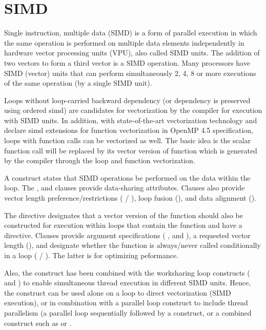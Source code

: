 \pagebreak
\chapter{SIMD}
\label{chap:simd}

Single instruction, multiple data (SIMD) is a form of parallel execution 
in which the same operation is performed on multiple data elements 
independently in hardware vector processing units (VPU), also called SIMD units.
The addition of two vectors to form a third vector is a SIMD operation.
Many processors have SIMD (vector) units that can perform simultaneously 
2, 4, 8 or more executions of the same operation (by a single SIMD unit). 

Loops without loop-carried backward dependency (or dependency is preserved using 
ordered simd) are candidates for vectorization by the compiler for 
execution with SIMD units. In addition, with state-of-the-art vectorization 
technology and declare simd extensions for function vectorization in OpenMP 4.5 
specification, loops with function calls can be vectorized as well. 
The basic idea is the scalar function call will be replaced by its vector version 
of function which is generated by the compiler through the loop and function 
vectorization.

A  construct states that SIMD operations be performed on the
data within the loop.  The ,  and 
 clauses provide data-sharing attributes.  Clauses 
also provide vector length preference/restrictions ( 
/ ), loop fusion (), and data 
alignment ().

The  directive designates
that a vector version of the function should also be constructed for 
execution within loops that contain the function and have a  
directive.  Clauses provide argument specifications ( 
, and ), a requested vector length 
(), and designate whether the function is always/never 
called conditionally in a loop ( / ). 
The latter is for optimizing peformance.

Also, the  construct has been combined with the worksharing loop 
constructs ( and ) to enable simultaneous thread 
execution in different SIMD units.  Hence, the  construct can be 
used alone on a loop to direct vectorization (SIMD execution), or in 
combination with a parallel loop construct to include thread parallelism 
(a parallel loop sequentially followed by a  construct,
or a combined construct such as  or 
.


